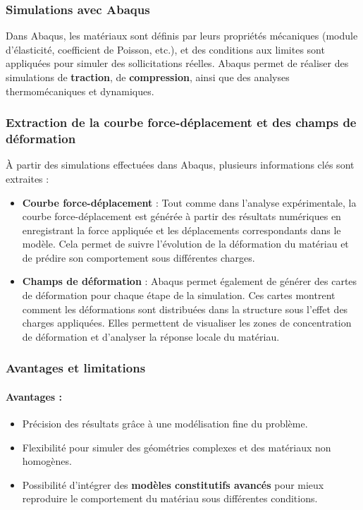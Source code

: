 \documentclass[12pt,a4paper]{article}
\begin{document}
\subsubsection{Simulations avec Abaqus}
Dans Abaqus, les matériaux sont définis par leurs propriétés mécaniques (module d'élasticité, coefficient de Poisson, etc.), et des conditions aux limites sont appliquées pour simuler des sollicitations réelles. Abaqus permet de réaliser des simulations de \textbf{traction}, de \textbf{compression}, ainsi que des analyses thermomécaniques et dynamiques.

\subsubsection{Extraction de la courbe force-déplacement et des champs de déformation}
À partir des simulations effectuées dans Abaqus, plusieurs informations clés sont extraites :
\begin{itemize}
    \item \textbf{Courbe force-déplacement} : Tout comme dans l'analyse expérimentale, la courbe force-déplacement est générée à partir des résultats numériques en enregistrant la force appliquée et les déplacements correspondants dans le modèle. Cela permet de suivre l'évolution de la déformation du matériau et de prédire son comportement sous différentes charges.
    \item \textbf{Champs de déformation} : Abaqus permet également de générer des cartes de déformation pour chaque étape de la simulation. Ces cartes montrent comment les déformations sont distribuées dans la structure sous l'effet des charges appliquées. Elles permettent de visualiser les zones de concentration de déformation et d'analyser la réponse locale du matériau.
\end{itemize}

\subsubsection{Avantages et limitations}
\paragraph{Avantages :}
\begin{itemize}
    \item Précision des résultats grâce à une modélisation fine du problème.
    \item Flexibilité pour simuler des géométries complexes et des matériaux non homogènes.
    \item Possibilité d'intégrer des \textbf{modèles constitutifs avancés} pour mieux reproduire le comportement du matériau sous différentes conditions.
\end{itemize}
\end{document}
